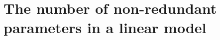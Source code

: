 \documentclass[]{book}\usepackage[]{graphicx}\usepackage[]{color}
\begin{document}
% 
% 
% 
% 
% 
% 
% 
% 
% 
% 
% 
% 
% 

\section{The number of non-redundant parameters in a linear model}
\end{document}
